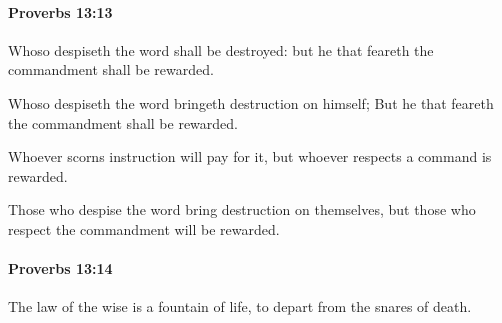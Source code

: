 		\paragraph{Proverbs 13:13} %
			\label{PROVERBS-13-13}

			Whoso despiseth the word shall be destroyed: but he that feareth the commandment shall be rewarded.

			\begin{versebox}
					\item[BHS] 
					\item[ASV] Whoso despiseth the word bringeth destruction on himself; But he that feareth the commandment shall be rewarded.
					\item[NIV] Whoever scorns instruction will pay for it, but whoever respects a command is rewarded.
					\item[NRSV] Those who despise the word bring destruction on themselves, but those who respect the commandment will be rewarded.
			\end{versebox}

		\paragraph{Proverbs 13:14} %
			\label{PROVERBS-13-14}

			The law of the wise is a fountain of life, to depart from the snares of death.

